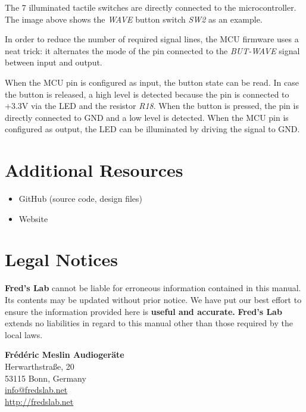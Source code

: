 \documentclass{scrartcl}
\begin{document}
The 7 illuminated tactile switches are directly connected to the microcontroller. The image above shows the \emph{WAVE} button switch \emph{SW2} as an example.

In order to reduce the number of required signal lines, the MCU firmware uses a neat trick: it alternates the mode of the pin connected to the \emph{BUT-WAVE} signal between input and output.

When the MCU pin is configured as input, the button state can be read. In case the button is released, a high level is detected because the pin is connected to +3.3V via the LED and the resistor \emph{R18}. When the button is pressed, the pin is directly connected to GND and a low level is detected. When the MCU pin is configured as output, the LED can be illuminated by driving the signal to GND.

\section{Additional Resources}

\begin{itemize}
    \item GitHub (source code, design files)
    \item Website
\end{itemize}

\pagebreak


\section{Legal Notices}

\textbf{Fred's Lab} cannot be liable for erroneous information contained in this manual. Its contents may be updated without prior notice. We have put our best effort to ensure the information provided here is \textbf{useful and accurate.} \textbf{Fred's Lab} extends no liabilities in regard to this manual other than those required by the local laws.

\vspace{0.25cm}
\begin{center}
    \textbf{Frédéric Meslin Audiogeräte} \\
    Herwarthstraße, 20 \\
    53115 Bonn, Germany \\
    \url{info@fredslab.net} \\
    \url{http://fredslab.net} \\
\end{center}
\end{document}
